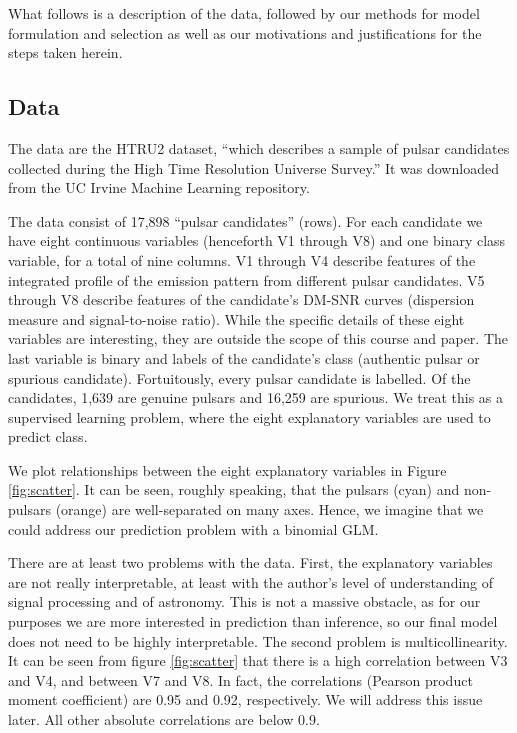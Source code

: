 \documentclass[11pt, oneside]{article}
\begin{document}
What follows is a description of the data, followed by our methods for model formulation and selection as well as our motivations and justifications for the steps taken herein. 

\subsection{Data}
\label{subsec:data}

The data are the HTRU2 dataset, ``which describes a sample of pulsar candidates collected during the High Time Resolution Universe Survey.'' \cite{data} It was downloaded from the UC Irvine Machine Learning repository.

The data consist of 17,898 ``pulsar candidates'' (rows). For each candidate we have eight continuous variables (henceforth V1 through V8) and one binary class variable, for a total of nine columns. V1 through V4 describe features of the integrated profile of the emission pattern from different pulsar candidates. V5 through V8 describe features of the candidate's DM-SNR curves (dispersion measure and signal-to-noise ratio). \cite{data} While the specific details of these eight variables are interesting, they are outside the scope of this course and paper. The last variable is binary and labels of the candidate's class (authentic pulsar or spurious candidate). Fortuitously, every pulsar candidate is labelled. Of the candidates, 1,639 are genuine pulsars and 16,259 are spurious. We treat this as a supervised learning problem, where the eight explanatory variables are used to predict class. 

We plot relationships between the eight explanatory variables in Figure {\ref{fig:scatter}}. It can be seen, roughly speaking, that the pulsars (cyan) and non-pulsars (orange) are well-separated on many axes. Hence, we imagine that we could address our prediction problem with a binomial GLM. 

There are at least two problems with the data. First, the explanatory variables are not really interpretable, at least with the author's level of understanding of signal processing and of astronomy. This is not a massive obstacle, as for our purposes we are more interested in prediction than inference, so our final model does not need to be highly interpretable. The second problem is multicollinearity. It can be seen from figure {\ref{fig:scatter}} that there is a high correlation between V3 and V4, and between V7 and V8. In fact, the correlations (Pearson product moment coefficient) are 0.95 and 0.92, respectively. We will address this issue later. All other absolute correlations are below 0.9. 
\end{document}
